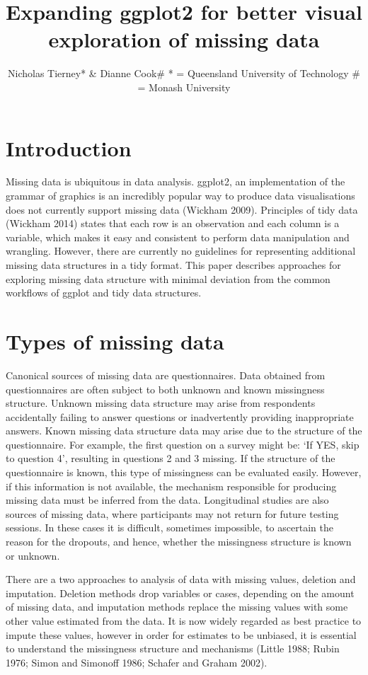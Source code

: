 \documentclass[]{article}
\title{Expanding ggplot2 for better visual exploration of missing data}
\author{Nicholas Tierney* \& Dianne Cook\# * = Queensland University of
Technology \# = Monash University}
\date{}
\begin{document}
\maketitle

\section{Introduction}\label{introduction}

Missing data is ubiquitous in data analysis. ggplot2, an implementation
of the grammar of graphics is an incredibly popular way to produce data
visualisations does not currently support missing data (Wickham 2009).
Principles of tidy data (Wickham 2014) states that each row is an
observation and each column is a variable, which makes it easy and
consistent to perform data manipulation and wrangling. However, there
are currently no guidelines for representing additional missing data
structures in a tidy format. This paper describes approaches for
exploring missing data structure with minimal deviation from the common
workflows of ggplot and tidy data structures.

\section{Types of missing data}\label{types-of-missing-data}

Canonical sources of missing data are questionnaires. Data obtained from
questionnaires are often subject to both unknown and known missingness
structure. Unknown missing data structure may arise from respondents
accidentally failing to answer questions or inadvertently providing
inappropriate answers. Known missing data structure data may arise due
to the structure of the questionnaire. For example, the first question
on a survey might be: `If YES, skip to question 4', resulting in
questions 2 and 3 missing. If the structure of the questionnaire is
known, this type of missingness can be evaluated easily. However, if
this information is not available, the mechanism responsible for
producing missing data must be inferred from the data. Longitudinal
studies are also sources of missing data, where participants may not
return for future testing sessions. In these cases it is difficult,
sometimes impossible, to ascertain the reason for the dropouts, and
hence, whether the missingness structure is known or unknown.

There are a two approaches to analysis of data with missing values,
deletion and imputation. Deletion methods drop variables or cases,
depending on the amount of missing data, and imputation methods replace
the missing values with some other value estimated from the data. It is
now widely regarded as best practice to impute these values, however in
order for estimates to be unbiased, it is essential to understand the
missingness structure and mechanisms (Little 1988; Rubin 1976; Simon and
Simonoff 1986; Schafer and Graham 2002).
\end{document}
